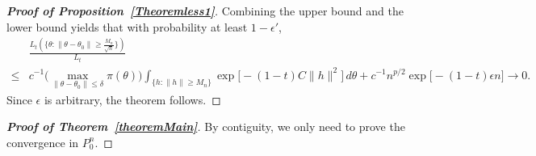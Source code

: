 \documentclass[11pt]{article}
\theoremstyle{plain}
\theoremstyle{definition}
\theoremstyle{remark}
\begin{document}
\begin{appendices}
\begin{proof}[\textbf{Proof of Proposition~\ref{Theoremless1}}]
     Combining the upper bound and the lower bound yields that with probability at least $1-\epsilon'$,
     $$
     \begin{aligned}
         &
       \frac{L_{t} ( \{\theta: \|\theta-\theta_0\|\geq \frac{M_n}{\sqrt{n}}\})}{L_{t}}
          \\
          \leq&
         c^{-1}\big(\max_{\|\theta-\theta_0\|\leq \delta} \pi(\theta)\big)
         \int_{\big\{h:\|h\|\geq M_n\big\}}\exp\big[-(1-t)C \|h\|^2\big]\, d\theta
        +
         c^{-1}n^{p/2} \exp\big[-(1-t)\epsilon n\big]
         \to 0.
     \end{aligned}
     $$
    Since $\epsilon $ is arbitrary, the theorem follows.
\end{proof}



\begin{proof}[\textbf{Proof of Theorem~\ref{theoremMain}}]
    By contiguity, we only need to prove the convergence in $P_0^n$.


\end{proof}
\end{appendices}
\end{document}
